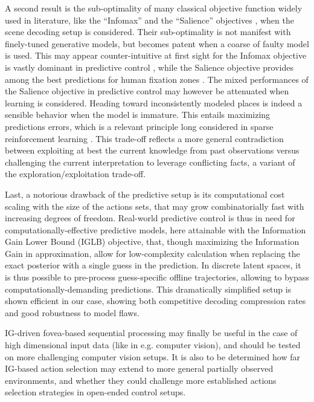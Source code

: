 \documentclass[12pt,twoside,openright]{article}
\begin{document}
A second result is the sub-optimality of many classical objective function widely used in literature, like the ``Infomax'' \citep{butko2010infomax} and the ``Salience'' objectives \citep{itti2005bayesian}, when the scene decoding setup is considered. Their sub-optimality is not manifest with finely-tuned generative models, but becomes patent when a coarse of faulty model is used.
This may appear counter-intuitive at first sight for the Infomax objective is vastly dominant in predictive control \citep{najemnik2009simple}, while the Salience objective provides among the best predictions for human fixation zones \citep{itti2005bayesian}. The mixed performances of the Salience objective in predictive control may however be attenuated when learning is considered. Heading toward inconsistently modeled places is indeed a sensible behavior when the model is immature. This entails maximizing predictions errors, which is a relevant principle long considered in sparse reinforcement learning \citep{schmidhuber1991curious,oudeyer2008can,pathak2017curiosity}. 
This trade-off reflects a more general contradiction between exploiting at best the current knowledge from past observations versus challenging the current interpretation to leverage conflicting facts, a variant of the exploration/exploitation trade-off. 

Last, a notorious drawback of the predictive setup is its computational cost scaling with the size of the actions sets, that may grow combinatorially fast with increasing degrees of freedom. Real-world predictive control is thus in need for computationally-effective predictive models, here attainable with the Information Gain Lower Bound (IGLB) objective, that, though maximizing the Information Gain in approximation, allow for {\color{Purple}low-complexity calculation when replacing the exact posterior with a single guess in the prediction}. In discrete latent spaces, it is thus possible to pre-process guess-specific offline trajectories, allowing to bypass computationally-demanding predictions. This dramatically simplified setup is shown efficient in our case, showing both competitive decoding compression rates and good robustness to model flaws. 

{\color{Purple} IG-driven fovea-based sequential processing may finally be useful in the case of high dimensional input data (like in e.g. computer vision), and should be tested on more challenging computer vision setups. 
	It is also to be determined how far IG-based action selection  may extend to more general partially observed environments, and whether they could challenge more established actions selection strategies in open-ended control setups.}
\end{document}
